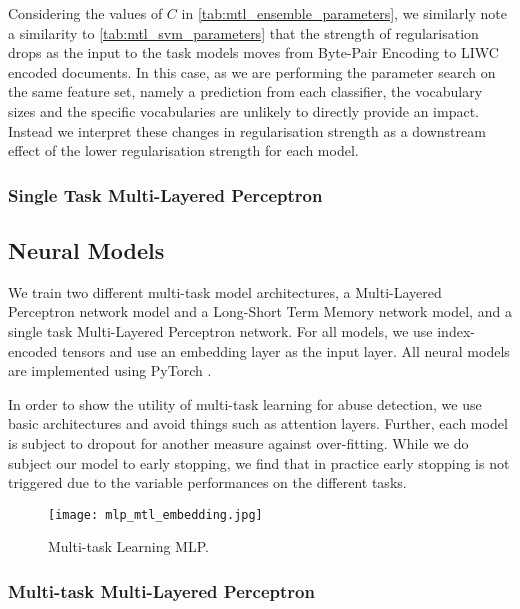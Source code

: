 Considering the values of $C$ in \autoref{tab:mtl_ensemble_parameters}, we similarly note a similarity to \autoref{tab:mtl_svm_parameters} that the strength of regularisation drops as the input to the task models moves from Byte-Pair Encoding to LIWC encoded documents. In this case, as we are performing the parameter search on the same feature set, namely a prediction from each classifier, the vocabulary sizes and the specific vocabularies are unlikely to directly provide an impact. Instead we interpret these changes in regularisation strength as a downstream effect of the lower regularisation strength for each model.

\subsubsection{Single Task Multi-Layered Perceptron}


\subsection{Neural Models}

We train two different multi-task model architectures, a Multi-Layered Perceptron network model and a Long-Short Term Memory network model, and a single task Multi-Layered Perceptron network. For all models, we use index-encoded tensors and use an embedding layer as the input layer. All neural models are implemented using PyTorch \cite{Paszke:2019}.

In order to show the utility of multi-task learning for abuse detection, we use basic architectures and avoid things such as attention layers. Further, each model is subject to dropout for another measure against over-fitting.  While we do subject our model to early stopping, we find that in practice early stopping is not triggered due to the variable performances on the different tasks.

\begin{figure}
  \centering
  \texttt{[image: mlp\_mtl\_embedding.jpg]}
  \caption{Multi-task Learning MLP.}
  \label{fig:mlp_mtl}
\end{figure}


\subsubsection{Multi-task Multi-Layered Perceptron}

